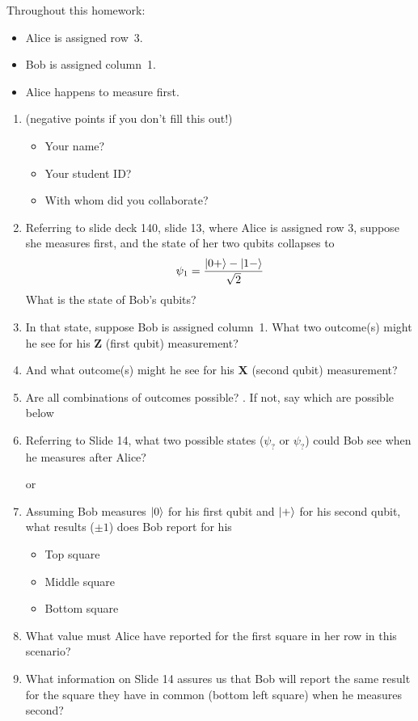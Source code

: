 \documentclass[12pt]{article}
\begin{document}
Throughout this homework:
\begin{itemize}
    \item Alice is assigned row~3.
    \item Bob is assigned column~1.  
    \item Alice happens to measure first.
    \end{itemize}
\begin{enumerate}[font=\bfseries]
\item {} (negative points if you don't fill this out!)
\begin{itemize}
    \item Your name?
    \item Your student ID?
    \item With whom did you collaborate?
\end{itemize}
    \item {} Referring to slide deck 140, slide 13, where Alice is assigned row 3, suppose she measures first, and the state of her two qubits collapses to \[ \psi_{1}=\frac{\ket{0+}-\ket{1-}}{\sqrt{2}} \]
    What is the state of Bob's qubits? 
    
    \item {} In that state, suppose Bob is assigned column~1.  What two outcome(s) might he see for his \textbf{Z} (first qubit) measurement?
    
    \item {} And what outcome(s) might he see for his \textbf{X} (second qubit) measurement?
    
    \Blank[2in]
    
    \item {} Are all combinations of outcomes possible?  \Blank{}.  If not, say which are possible below
    
    \Blank[2in]{}
    \item {} Referring to Slide 14, what two possible states ($\psi_{?}$ or $\psi_{?}$) could Bob see when he measures after Alice?
    
    \Blank{} or \Blank{}
    \item {} Assuming Bob measures $\ket{0}$ for his first qubit and $\ket{+}$ for his second qubit, what results ($\pm 1$) does Bob report for his
    \begin{itemize}
        \item Top square \Blank{}
        \item Middle square \Blank{}
        \item Bottom square \Blank{}
    \end{itemize}
    \item {} What value must Alice have reported for the first square in her row in this scenario? \Blank{}
    \item {} What information on Slide 14 assures us that Bob will report the same result for the square they have in common (bottom left square) when he measures second?
    
\end{enumerate}
\end{document}
